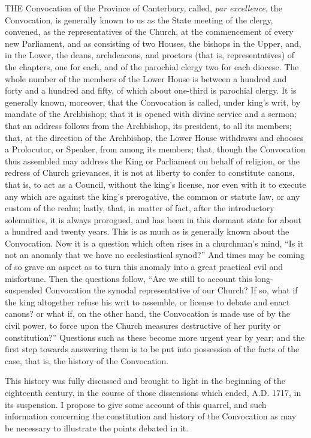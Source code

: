 
THE
Convocation of the Province of Canterbury, called, \emph{par excellence},
the Convocation, is generally known to us as the State meeting of the
clergy, convened, as the representatives of the Church, at the
commencement of every new Parliament, and as consisting of two Houses,
the bishops in the Upper, and, in the Lower, the deans, archdeacons,
and proctors (that is, representatives) of the chapters, one for each,
and of the parochial clergy two for each diocese. The whole number of
the members of the Lower House is between a hundred and forty and a
hundred and fifty, of which about one-third is parochial clergy. It is
generally known, moreover, that the Convocation is called, under king's
writ, by mandate of the Archbishop; that it is opened with divine
service and a sermon; that an address follows from the Archbishop, its
president, to all its members; that, at the direction of the
Archbishop, the Lower House withdraws and chooses a Prolocutor, or
Speaker, from among its members; that, though the Convocation
thus assembled may address the King or Parliament on behalf of
religion, or the redress of Church grievances, it is not at liberty to
confer to constitute canons, that is, to act as a Council, without the
king's license, nor even with it to execute any which are against the
king's prerogative, the common or statute law, or any custom of the
realm; lastly, that, in matter of fact, after the introductory
solemnities, it is always prorogued, and has been in this dormant
state for about a hundred and twenty years. This is as much as is
generally known about the Convocation. Now it is a question which
often rises in a churchman's mind, ``Is it not an anomaly that we have
no ecclesiastical synod?'' And times may be coming of so grave an
aspect as to turn this anomaly into a great practical evil and
misfortune. Then the questions follow, ``Are we still to account this
long-suspended Convocation the synodal representative of our Church?
If so, what if the king altogether refuse his writ to assemble, or
license to debate and enact canons? or what if, on the other hand, the
Convocation is made use of by the civil power, to force upon the
Church measures destructive of her purity or constitution?'' Questions
such as these become more urgent year by year; and the first step
towards answering them is to be put into possession of the facts of
the case, that is, the history of the Convocation.

This history was fully
discussed and brought to light in the beginning of the eighteenth
century, in the course of those dissensions which ended, A.D. 1717, in its
suspension. I propose to give some account of this quarrel, and such
information concerning the constitution and history of the Convocation
as may be necessary to illustrate the points debated in it.

